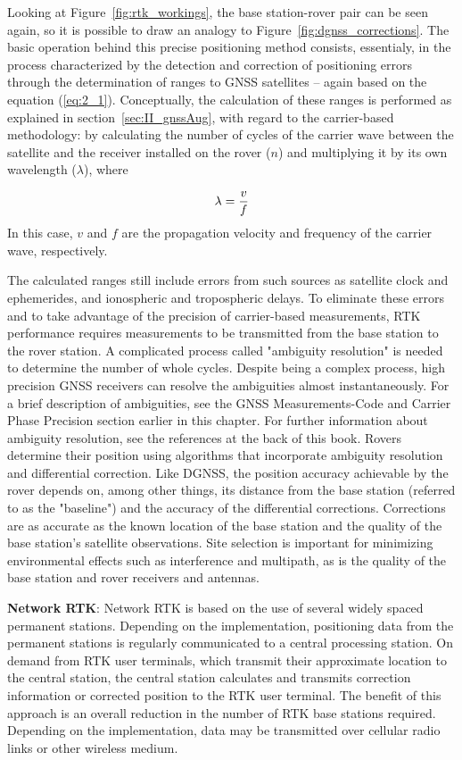 Looking at Figure~\ref{fig:rtk_workings}, the base station-rover pair can be seen again, so it is possible to draw an analogy to Figure~\ref{fig:dgnss_corrections}. The basic operation behind this precise positioning method consists, essentialy, in the process characterized by the detection and correction of positioning errors through the determination of ranges to GNSS satellites -- again based on the equation (\ref{eq:2_1}). Conceptually, the calculation of these ranges is performed as explained in section~\ref{sec:II_gnssAug}, with regard to the carrier-based methodology: by calculating the number of cycles of the carrier wave between the satellite and the receiver installed on the rover ($n$) and multiplying it by its own wavelength ($\lambda$), where

\begin{equation}\label{eq:2_4}
    \lambda = \frac{v}{f}\medskip
\end{equation}
In this case, $v$ and $f$ are the propagation velocity and frequency of the carrier wave, respectively.

The calculated ranges still include errors from such sources as satellite clock and ephemerides, and ionospheric and tropospheric delays. To eliminate these errors and to take advantage of the precision of carrier-based measurements, RTK performance requires measurements to be transmitted from the base station to the rover station.
A complicated process called "ambiguity resolution" is needed to determine the number of whole cycles. Despite being a complex process, high precision GNSS receivers can resolve the ambiguities almost instantaneously. For a brief description of ambiguities, see the GNSS Measurements-Code and Carrier Phase Precision section earlier in this chapter. For further information about ambiguity resolution, see the references at the back of this book.
Rovers determine their position using algorithms that incorporate ambiguity resolution and differential correction. Like DGNSS, the position accuracy achievable by the rover depends on, among other things, its distance from the base station (referred to as the "baseline") and the accuracy of the differential corrections.
Corrections are as accurate as the known location of the base station and the quality of the base station's satellite observations. Site selection is important for minimizing environmental effects such as interference and multipath, as is the quality of the base station and rover receivers and antennas.

\textbf{Network RTK}:
Network RTK is based on the use of several widely spaced permanent stations. 
Depending on the implementation, positioning data from the permanent stations is regularly communicated to a central processing station.
On demand from RTK user terminals, which transmit their approximate location to the central station, the central station calculates and transmits correction information or corrected position to the RTK user terminal.
The benefit of this approach is an overall reduction in the number of RTK base stations required. Depending on the implementation, data may be transmitted over cellular radio links or other wireless medium.

